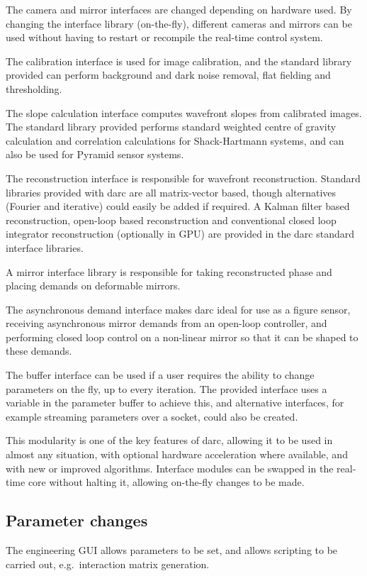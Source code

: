 \documentclass[a4,10pt]{article}
\begin{document}
The camera and mirror interfaces are changed depending on hardware
used.  By changing the interface library (on-the-fly), different
cameras and mirrors can be used without having to restart or recompile
the real-time control system.

The calibration interface is used for image calibration, and the
standard library provided can perform background and dark noise
removal, flat fielding and thresholding.

The slope calculation interface computes wavefront slopes from
calibrated images.  The standard library provided performs standard
weighted centre of gravity calculation and correlation calculations
for Shack-Hartmann systems, and can also be used for Pyramid sensor
systems.

The reconstruction interface is responsible for wavefront
reconstruction.  Standard libraries provided with darc are all
matrix-vector based, though alternatives (Fourier and iterative) could
easily be added if required.  A Kalman filter based reconstruction,
open-loop based reconstruction and conventional closed loop integrator
reconstruction (optionally in GPU) are provided in the darc standard
interface libraries.

A mirror interface library is responsible for taking reconstructed
phase and placing demands on deformable mirrors.  

The asynchronous demand interface makes darc ideal for use as a figure
sensor, receiving asynchronous mirror demands from an open-loop
controller, and performing closed loop control on a non-linear mirror
so that it can be shaped to these demands.

The buffer interface can be used if a user requires the ability to
change parameters on the fly, up to every iteration.  The provided
interface uses a variable in the parameter buffer to achieve this, and
alternative interfaces, for example streaming parameters over a
socket, could also be created.

This modularity is one of the key features of darc, allowing it to be
used in almost any situation, with optional hardware acceleration
where available, and with new or improved algorithms.  Interface
modules can be swapped in the real-time core without halting it,
allowing on-the-fly changes to be made.



\subsection{Parameter changes}
The engineering GUI allows parameters to be set, and allows scripting
to be carried out, e.g.\ interaction matrix generation.
\end{document}
